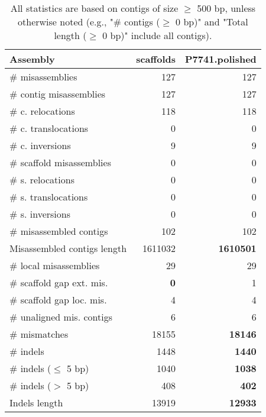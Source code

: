 \documentclass[12pt,a4paper]{article}
\begin{document}
\begin{table}[ht]
\begin{center}
\caption{All statistics are based on contigs of size $\geq$ 500 bp, unless otherwise noted (e.g., "\# contigs ($\geq$ 0 bp)" and "Total length ($\geq$ 0 bp)" include all contigs).}
\begin{tabular}{|l*{2}{|r}|}
\hline
Assembly & scaffolds & P7741.polished \\ \hline
\# misassemblies & 127 & 127 \\ \hline
\hspace{2mm}\# contig misassemblies & 127 & 127 \\ \hline
\hspace{5mm}\# c. relocations & 118 & 118 \\ \hline
\hspace{5mm}\# c. translocations & 0 & 0 \\ \hline
\hspace{5mm}\# c. inversions & 9 & 9 \\ \hline
\hspace{2mm}\# scaffold misassemblies & 0 & 0 \\ \hline
\hspace{5mm}\# s. relocations & 0 & 0 \\ \hline
\hspace{5mm}\# s. translocations & 0 & 0 \\ \hline
\hspace{5mm}\# s. inversions & 0 & 0 \\ \hline
\# misassembled contigs & 102 & 102 \\ \hline
Misassembled contigs length & 1611032 & {\bf 1610501} \\ \hline
\# local misassemblies & 29 & 29 \\ \hline
\# scaffold gap ext. mis. & {\bf 0} & 1 \\ \hline
\# scaffold gap loc. mis. & 4 & 4 \\ \hline
\# unaligned mis. contigs & 6 & 6 \\ \hline
\# mismatches & 18155 & {\bf 18146} \\ \hline
\# indels & 1448 & {\bf 1440} \\ \hline
\hspace{5mm}\# indels ($\leq$ 5 bp) & 1040 & {\bf 1038} \\ \hline
\hspace{5mm}\# indels ($>$ 5 bp) & 408 & {\bf 402} \\ \hline
Indels length & 13919 & {\bf 12933} \\ \hline
\end{tabular}
\end{center}
\end{table}
\end{document}
